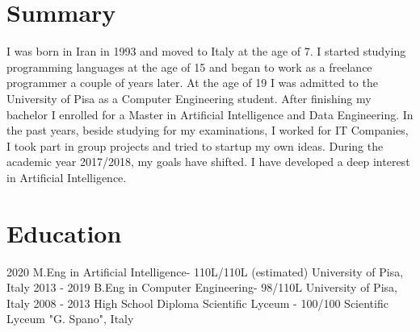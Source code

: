\documentclass[]{friggeri-cv}
\begin{document}

\section{Summary}
\vspace{-3mm}
I was born in Iran in 1993 and moved to Italy at the age of 7. I started
studying programming languages at the age of 15 and began to work as a freelance
programmer a couple of years later. At the age of 19 I was admitted to the
University of Pisa as a Computer Engineering student. After finishing my
bachelor I enrolled for a Master in Artificial Intelligence and Data
Engineering. In the past years, beside studying for my examinations, I worked
for IT Companies, I took part in group projects and tried to startup my own ideas.
During the academic year 2017/2018, my goals have shifted. I have developed a
deep interest in Artificial Intelligence.


\section{Education}
\vspace{-3mm}
\begin{entrylist}
\entry
{2020}
{M.Eng {\normalfont\small{in Artificial Intelligence\hspace{1.55cm}- 110L/110L (estimated)}}}
{University of Pisa, Italy}
{\vspace{-3mm}}
\entry
{2013 - 2019}
{B.Eng {\normalfont\small{in Computer Engineering\hspace{1.19cm}- 98/110L}}}
{University of Pisa, Italy}
{\vspace{-3mm}}
\entry
{2008 - 2013}
{High School Diploma {\normalfont\small{Scientific Lyceum - 100/100}}}
{Scientific Lyceum "G. Spano", Italy}
{\vspace{-5mm}}
\end{entrylist}

\patchcmd{\entry}{14.8cm}{11.8cm}{}{}
\end{document}
